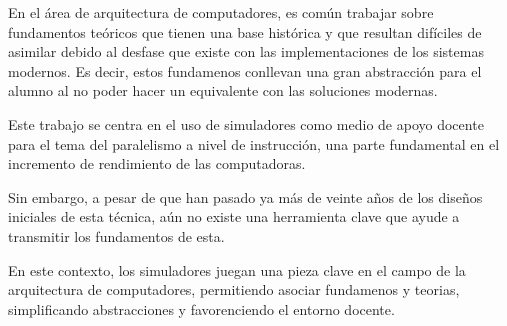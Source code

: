 En el área de arquitectura de computadores, es común trabajar sobre fundamentos teóricos
que tienen una base histórica y que resultan difíciles de asimilar debido 
al desfase que existe con las implementaciones de los sistemas modernos. Es decir, estos 
fundamenos conllevan una gran abstracción para el alumno al no poder hacer un 
equivalente con las soluciones modernas.

\bigskip
Este trabajo se centra en el uso de simuladores como medio de apoyo docente para el 
tema del  paralelismo a nivel de instrucción, una parte fundamental en el incremento
de rendimiento de las computadoras.

\bigskip
Sin embargo, a pesar de que han pasado ya más de veinte años de los diseños iniciales de esta 
técnica, aún no existe una herramienta clave que ayude a transmitir los fundamentos de 
esta.

\bigskip
En este contexto, los simuladores juegan una pieza clave en el campo de la arquitectura de 
computadores, permitiendo asociar fundamenos y teorias, simplificando abstracciones y 
favorenciendo el entorno docente.